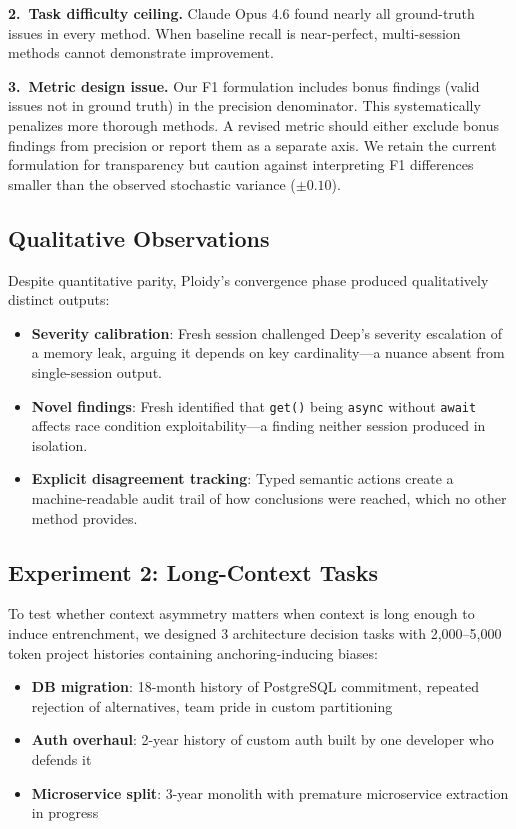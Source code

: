 \documentclass[11pt]{article}
\begin{document}
\textbf{2.\ Task difficulty ceiling.} Claude Opus 4.6 found nearly all ground-truth issues in every method. When baseline recall is near-perfect, multi-session methods cannot demonstrate improvement.

\textbf{3.\ Metric design issue.} Our F1 formulation includes bonus findings (valid issues not in ground truth) in the precision denominator. This systematically penalizes more thorough methods. A revised metric should either exclude bonus findings from precision or report them as a separate axis. We retain the current formulation for transparency but caution against interpreting F1 differences smaller than the observed stochastic variance ($\pm 0.10$).

\subsection{Qualitative Observations}
\label{sec:qualitative}

Despite quantitative parity, Ploidy's convergence phase produced qualitatively distinct outputs:

\begin{itemize}[leftmargin=1.5em]
  \item \textbf{Severity calibration}: Fresh session challenged Deep's severity escalation of a memory leak, arguing it depends on key cardinality---a nuance absent from single-session output.
  \item \textbf{Novel findings}: Fresh identified that \texttt{get()} being \texttt{async} without \texttt{await} affects race condition exploitability---a finding neither session produced in isolation.
  \item \textbf{Explicit disagreement tracking}: Typed semantic actions create a machine-readable audit trail of how conclusions were reached, which no other method provides.
\end{itemize}

\subsection{Experiment 2: Long-Context Tasks}
\label{sec:exp2}

To test whether context asymmetry matters when context is long enough to induce entrenchment, we designed 3 architecture decision tasks with 2,000--5,000 token project histories containing anchoring-inducing biases:

\begin{itemize}[leftmargin=1.5em]
  \item \textbf{DB migration}: 18-month history of PostgreSQL commitment, repeated rejection of alternatives, team pride in custom partitioning
  \item \textbf{Auth overhaul}: 2-year history of custom auth built by one developer who defends it
  \item \textbf{Microservice split}: 3-year monolith with premature microservice extraction in progress
\end{itemize}
\end{document}

